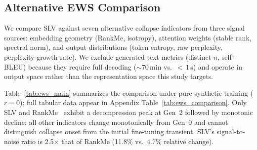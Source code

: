 \subsection{Alternative EWS Comparison}
\label{subsec:alt_ews}

We compare SLV against seven alternative collapse indicators from three signal sources: embedding geometry (RankMe, isotropy), attention weights (stable rank, spectral norm), and output distributions (token entropy, raw perplexity, perplexity growth rate).
We exclude generated-text metrics (distinct-$n$, self-BLEU) because they require full decoding (${\sim}$70\,min vs.\ ${<}\,1$\,s) and operate in output space rather than the representation space this study targets.

Table~\ref{tab:ews_main} summarizes the comparison under pure-synthetic training ($r{=}0$); full tabular data appear in Appendix Table~\ref{tab:ews_comparison}.
Only SLV and RankMe~\citep{rankme2023} exhibit a decompression peak at Gen~2 followed by monotonic decline; all other indicators change monotonically from Gen~0 and cannot distinguish collapse onset from the initial fine-tuning transient.
SLV's signal-to-noise ratio is 2.5$\times$ that of RankMe (11.8\% vs.\ 4.7\% relative change).

